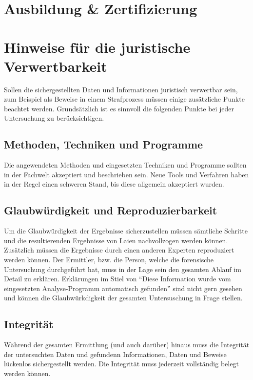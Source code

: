 \section{Ausbildung \& Zertifizierung}



\section{Hinweise für die juristische Verwertbarkeit}
Sollen die sichergestellten Daten und Informationen juristisch verwertbar sein, zum Beispiel als Beweise in einem Strafprozess müssen einige zusätzliche Punkte beachtet werden. Grundsätzlich ist es sinnvoll die folgenden Punkte bei jeder Untersuchung zu berücksichtigen.

\subsection{Methoden, Techniken und Programme}
Die angewendeten Methoden und eingesetzten Techniken und Programme sollten in der Fachwelt akzeptiert und beschrieben sein. Neue Tools und Verfahren haben in der Regel einen schweren Stand, bis diese allgemein akzeptiert wurden.

\subsection{Glaubwürdigkeit und Reproduzierbarkeit}
Um die Glaubwürdigkeit der Ergebnisse sicherzustellen müssen sämtliche Schritte und die resultierenden Ergebnisse von Laien nachvollzogen werden können. Zusätzlich müssen die Ergebnisse durch einen anderen Experten reproduziert werden können. Der Ermittler, bzw. die Person, welche die forensische Untersuchung durchgeführt hat, muss in der Lage sein den gesamten Ablauf im Detail zu erklären. Erklärungen im Stiel von "`Diese Information wurde vom eingesetzten Analyse-Programm automatisch gefunden"' sind nicht gern gesehen und können die Glaubwürkdigkeit der gesamten Untersuschung in Frage stellen.


\subsection{Integrität}
Während der gesamten Ermittlung (und auch darüber) hinaus muss die Integrität der untersuchten Daten und gefundenn Informationen, Daten und Beweise lückenlos sichergestellt werden. Die Integrität muss jederzeit vollständig belegt werden können.

